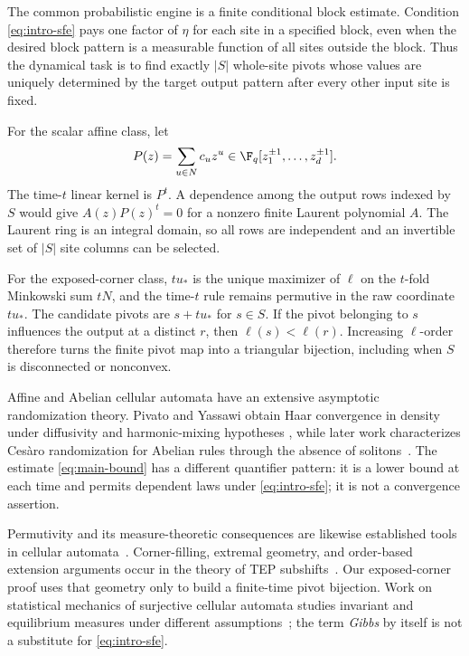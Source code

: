 The common probabilistic engine is a finite conditional block estimate.
Condition \eqref{eq:intro-sfe} pays one factor of $\eta$ for each site in a
specified block, even when the desired block pattern is a measurable
function of all sites outside the block.  Thus the dynamical task is to find
exactly $|S|$ whole-site pivots whose values are uniquely determined by the
target output pattern after every other input site is fixed.

For the scalar affine class, let
\[
  P(z)=\sum_{u\in N}c_u z^u
  \in\F_q[z_1^{\pm1},\ldots,z_d^{\pm1}].
\]
The time-$t$ linear kernel is $P^t$.  A dependence among the output rows
indexed by $S$ would give $A(z)P(z)^t=0$ for a nonzero finite Laurent
polynomial $A$.  The Laurent ring is an integral domain, so all rows are
independent and an invertible set of $|S|$ site columns can be selected.

For the exposed-corner class, $tu_*$ is the unique maximizer of $\ell$ on the
$t$-fold Minkowski sum $tN$, and the time-$t$ rule remains permutive in the
raw coordinate $tu_*$.  The candidate pivots are $s+tu_*$ for $s\in S$.
If the pivot belonging to $s$ influences the output at a distinct $r$, then
$\ell(s)<\ell(r)$.  Increasing $\ell$-order therefore turns the finite
pivot map into a triangular bijection, including when $S$ is disconnected or
nonconvex.



Affine and Abelian cellular automata have an extensive asymptotic
randomization theory.  Pivato and Yassawi obtain Haar convergence in density
under diffusivity and harmonic-mixing hypotheses
\cite{pivatoYassawi2002limit,pivatoYassawi2004limitII}, while later work
characterizes Ces\`aro randomization for Abelian rules through the absence of
solitons~\cite{hellouinSaloTheyssier2020randomization}.  The estimate
\eqref{eq:main-bound} has a different quantifier pattern: it is a lower bound
at each time and permits dependent laws under \eqref{eq:intro-sfe}; it is not
a convergence assertion.

Permutivity and its measure-theoretic consequences are likewise established
tools in cellular automata~\cite{pivato2005bipermutative}.  Corner-filling,
extremal geometry, and order-based extension arguments occur in the theory of
TEP subshifts~\cite{salo2022cutting}.  Our exposed-corner proof uses that
geometry only to build a finite-time pivot bijection.  Work on statistical
mechanics of surjective cellular automata studies invariant and equilibrium
measures under different assumptions~\cite{kariTaati2015statistical}; the
term \emph{Gibbs} by itself is not a substitute for
\eqref{eq:intro-sfe}.

